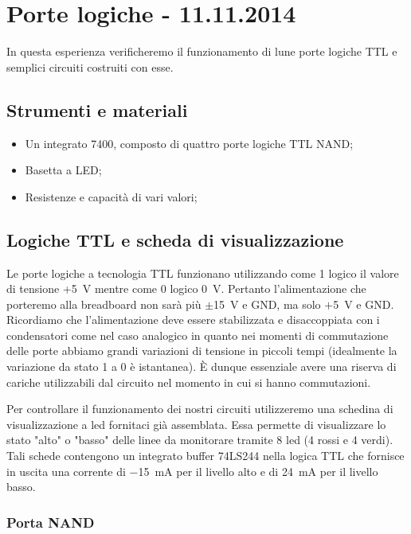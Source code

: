 \section{Porte logiche - 11.11.2014}

In questa esperienza verificheremo il funzionamento di lune porte logiche TTL e semplici circuiti costruiti con esse.

\subsection*{Strumenti e materiali}

\begin{itemize} [noitemsep]
	\item Un integrato 7400, composto di quattro porte logiche TTL NAND; %
	\item Basetta a LED;		
	\item Resistenze e capacità di vari valori;
\end{itemize}

\subsection{Logiche TTL e scheda di visualizzazione}

Le porte logiche a tecnologia TTL funzionano utilizzando come 1 logico il valore di tensione +\SI{5}{\volt} mentre come 0 logico \SI{0}{\volt}.
Pertanto l'alimentazione che porteremo alla breadboard non sarà più $\pm$\SI{15}{\V} e GND, ma solo $+$\SI{5}{\V} e GND.
Ricordiamo che l'alimentazione deve essere stabilizzata e disaccoppiata con i condensatori come nel caso analogico in quanto nei momenti di commutazione delle porte abbiamo grandi variazioni di tensione in piccoli tempi (idealmente la variazione da stato 1 a 0 è istantanea).
È dunque essenziale avere una riserva di cariche utilizzabili dal circuito nel momento in cui si hanno commutazioni.

Per controllare il funzionamento dei nostri circuiti utilizzeremo una schedina di visualizzazione a led fornitaci già assemblata.
Essa permette di visualizzare lo stato "alto" o "basso" delle linee da monitorare tramite 8 led (4 rossi e 4 verdi).
Tali schede contengono un integrato buffer 74LS244 nella logica TTL che fornisce in uscita una corrente di \SI{-15}{\milli\ampere} per il livello alto e di \SI{24}{\milli\ampere} per il livello basso.

\subsubsection{Porta NAND}

